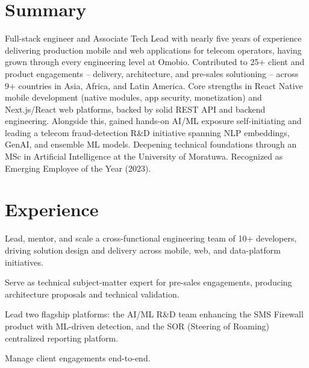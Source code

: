\documentclass[10.5pt]{article}
\begin{document}

\section*{Summary}
Full-stack engineer and Associate Tech Lead with nearly five years of experience delivering production mobile and web applications for telecom operators, having grown through every engineering level at Omobio. Contributed to 25+ client and product engagements -- delivery, architecture, and pre-sales solutioning -- across 9+ countries in Asia, Africa, and Latin America. Core strengths in React Native mobile development (native modules, app security, monetization) and Next.js/React web platforms, backed by solid REST API and backend engineering. Alongside this, gained hands-on AI/ML exposure self-initiating and leading a telecom fraud-detection R\&D initiative spanning NLP embeddings, GenAI, and ensemble ML models. Deepening technical foundations through an MSc in Artificial Intelligence at the University of Moratuwa. Recognized as Emerging Employee of the Year (2023).

\section*{Experience}

\begin{cvitems}
  \item Lead, mentor, and scale a cross-functional engineering team of 10+ developers, driving solution design and delivery across mobile, web, and data-platform initiatives.
  \item Serve as technical subject-matter expert for pre-sales engagements, producing architecture proposals and technical validation.
  \item Lead two flagship platforms: the AI/ML R\&D team enhancing the SMS Firewall product with ML-driven detection, and the SOR (Steering of Roaming) centralized reporting platform.
  \item Manage client engagements end-to-end.
\end{cvitems}
\end{document}
